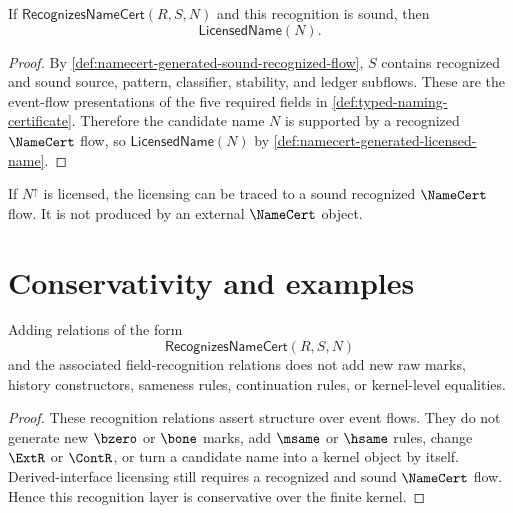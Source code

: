 \begin{theorem}
\label{thm:namecert-generated-sound-flow-licenses-name}
If $\mathsf{RecognizesNameCert}(R,S,N)$ and this recognition is sound, then
$$
  \mathsf{LicensedName}(N).
$$
\end{theorem}

\begin{proof}
By \autoref{def:namecert-generated-sound-recognized-flow}, $S$ contains recognized and sound source, pattern, classifier, stability, and ledger subflows. These are the event-flow presentations of the five required fields in \autoref{def:typed-naming-certificate}. Therefore the candidate name $N$ is supported by a recognized $\NameCert$ flow, so $\mathsf{LicensedName}(N)$ by \autoref{def:namecert-generated-licensed-name}.
\end{proof}

\begin{corollary}
\label{cor:namecert-generated-derived-licensing-mediated}
If $N^{\uparrow}$ is licensed, the licensing can be traced to a sound recognized $\NameCert$ flow. It is not produced by an external $\NameCert$ object.
\end{corollary}

\section{Conservativity and examples}
\label{sec:namecert-generated-conservativity-examples}

\begin{theorem}
\label{thm:namecert-generated-conservativity}
Adding relations of the form
$$
  \mathsf{RecognizesNameCert}(R,S,N)
$$
and the associated field-recognition relations does not add new raw marks, history constructors, sameness rules, continuation rules, or kernel-level equalities.
\end{theorem}

\begin{proof}
These recognition relations assert structure over event flows. They do not generate new $\bzero$ or $\bone$ marks, add $\msame$ or $\hsame$ rules, change $\ExtR$ or $\ContR$, or turn a candidate name into a kernel object by itself. Derived-interface licensing still requires a recognized and sound $\NameCert$ flow. Hence this recognition layer is conservative over the finite kernel.
\end{proof}

